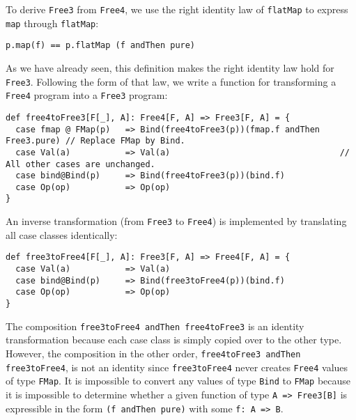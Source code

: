 To derive \lstinline!Free3!
from \lstinline!Free4!,
we use the right identity law of \lstinline!flatMap!
to express \lstinline!map!
through \lstinline!flatMap!:
\begin{lstlisting}
p.map(f) == p.flatMap (f andThen pure)
\end{lstlisting}
As we have already seen, this definition makes the right identity
law hold for \lstinline!Free3!.
Following the form of that law, we write a function for transforming
a \lstinline!Free4! program
into a \lstinline!Free3!
program:
\begin{lstlisting}
def free4toFree3[F[_], A]: Free4[F, A] => Free3[F, A] = {
  case fmap @ FMap(p)   => Bind(free4toFree3(p))(fmap.f andThen Free3.pure) // Replace FMap by Bind.
  case Val(a)           => Val(a)                                  // All other cases are unchanged.
  case bind@Bind(p)     => Bind(free4toFree3(p))(bind.f)
  case Op(op)           => Op(op)
}
\end{lstlisting}
An inverse transformation (from \lstinline!Free3!
to \lstinline!Free4!) is
implemented by translating all case classes identically:
\begin{lstlisting}
def free3toFree4[F[_], A]: Free3[F, A] => Free4[F, A] = {
  case Val(a)           => Val(a)
  case bind@Bind(p)     => Bind(free3toFree4(p))(bind.f)
  case Op(op)           => Op(op)
}
\end{lstlisting}
The composition \lstinline!free3toFree4 andThen free4toFree3!
is an identity transformation because each case class is simply copied
over to the other type. However, the composition in the other order,
\lstinline!free4toFree3 andThen free3toFree4!,
is not an identity since \lstinline!free3toFree4!
never creates \lstinline!Free4!
values of type \lstinline!FMap!.
It is impossible to convert any values of type \lstinline!Bind!
to \lstinline!FMap! because
it is impossible to determine whether a given function of type \lstinline!A => Free3[B]!
is expressible in the form \lstinline!(f andThen pure)!
with some \lstinline!f: A => B!.

